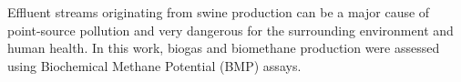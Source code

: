 Effluent streams originating from swine production can be a major cause of point-source pollution and very dangerous for the surrounding environment and human health. In this work, biogas and biomethane production were assessed using Biochemical Methane Potential (BMP) assays.